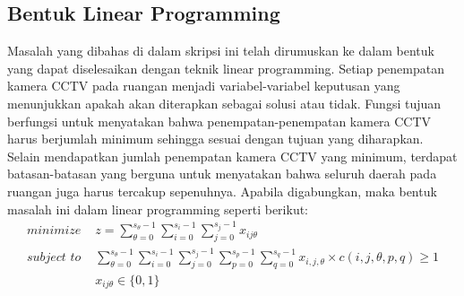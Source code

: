 \subsection{Bentuk Linear Programming}
Masalah yang dibahas di dalam skripsi ini telah dirumuskan ke dalam bentuk yang dapat diselesaikan dengan teknik linear programming. Setiap penempatan kamera CCTV pada ruangan menjadi variabel-variabel keputusan yang menunjukkan apakah akan diterapkan sebagai solusi atau tidak. Fungsi tujuan berfungsi untuk menyatakan bahwa penempatan-penempatan kamera CCTV harus berjumlah minimum sehingga sesuai dengan tujuan yang diharapkan. Selain mendapatkan jumlah penempatan kamera CCTV yang minimum, terdapat batasan-batasan yang berguna untuk menyatakan bahwa seluruh daerah pada ruangan juga harus tercakup sepenuhnya. Apabila digabungkan, maka bentuk masalah ini dalam linear programming seperti berikut:
\begin{equation*}
	\begin{split}
		\textit{minimize } & z = \sum_{\theta=0}^{s_{\theta}-1} \sum_{i=0}^{s_i-1} \sum_{j=0}^{s_j-1} x_{ij\theta}\\
		\textit{subject to } & \sum_{\theta=0}^{s_{\theta}-1} \sum_{i=0}^{s_i-1} \sum_{j=0}^{s_j-1} \sum_{p=0}^{s_p-1} \sum_{q=0}^{s_q-1} x_{i,j,\theta} \times c(i,j,\theta,p,q) \geq 1\\
		& x_{ij\theta} \in \{0,1\}
	\end{split}
\end{equation*}

















